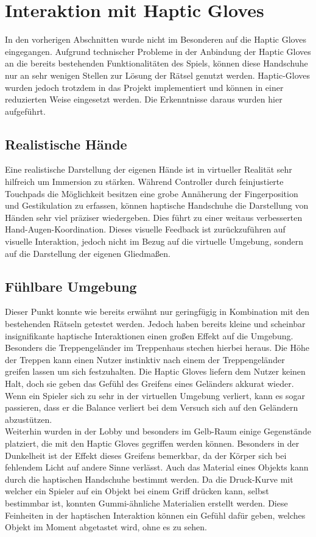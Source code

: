 \section{Interaktion mit Haptic Gloves}
In den vorherigen Abschnitten wurde nicht im Besonderen auf die Haptic Gloves eingegangen. Aufgrund technischer Probleme in der Anbindung der Haptic Gloves an die bereits bestehenden Funktionalitäten des Spiels, können diese Handschuhe nur an sehr wenigen Stellen zur Lösung der Rätsel genutzt werden. Haptic-Gloves wurden jedoch trotzdem in das Projekt implementiert und können in einer reduzierten Weise eingesetzt werden. Die Erkenntnisse daraus wurden hier aufgeführt.

\subsection{Realistische Hände}
Eine realistische Darstellung der eigenen Hände ist in virtueller Realität sehr hilfreich um Immersion zu stärken. Während Controller durch feinjustierte Touchpads die Möglichkeit besitzen eine grobe Annäherung der Fingerposition und Gestikulation zu erfassen, können haptische Handschuhe die Darstellung von Händen sehr viel präziser wiedergeben. Dies führt zu einer weitaus verbesserten Hand-Augen-Koordination. Dieses visuelle Feedback ist zurückzuführen auf visuelle Interaktion, jedoch nicht im Bezug auf die virtuelle Umgebung, sondern auf die Darstellung der eigenen Gliedmaßen.

\subsection{Fühlbare Umgebung}
Dieser Punkt konnte wie bereits erwähnt nur geringfügig in Kombination mit den bestehenden Rätseln getestet werden. Jedoch haben bereits kleine und scheinbar insignifikante haptische Interaktionen einen großen Effekt auf die Umgebung. Besonders die Treppengeländer im Treppenhaus stechen hierbei heraus. Die Höhe der Treppen kann einen Nutzer instinktiv nach einem der Treppengeländer greifen lassen um sich festzuhalten. Die Haptic Gloves liefern dem Nutzer keinen Halt, doch sie geben das Gefühl des Greifens eines Geländers akkurat wieder. Wenn ein Spieler sich zu sehr in der virtuellen Umgebung verliert, kann es sogar passieren, dass er die Balance verliert bei dem Versuch sich auf den Geländern abzustützen.\\

\noindent Weiterhin wurden in der Lobby und besonders im Gelb-Raum einige Gegenstände platziert, die mit den Haptic Gloves gegriffen werden können. Besonders in der Dunkelheit ist der Effekt dieses Greifens bemerkbar, da der Körper sich bei fehlendem Licht auf andere Sinne verlässt. Auch das Material eines Objekts kann durch die haptischen Handschuhe bestimmt werden. Da die Druck-Kurve mit welcher ein Spieler auf ein Objekt bei einem Griff drücken kann, selbst bestimmbar ist, konnten Gummi-ähnliche Materialien erstellt werden. Diese Feinheiten in der haptischen Interaktion können ein Gefühl dafür geben, welches Objekt im Moment abgetastet wird, ohne es zu sehen.\\
